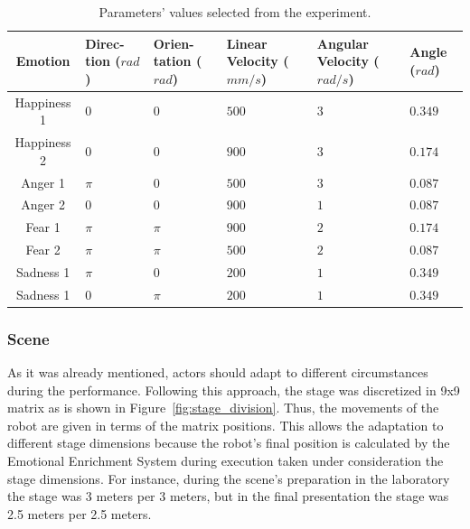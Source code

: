 \begin{table}[h]
\centering
\small
\caption{Parameters' values selected from the experiment.}
		\label{table:selected_fourth}
		\begin{tabular}{|c|p{0.9 cm}|p{0.9 cm}|p{0.9 cm}|p{1.05 cm}|p{0.9 cm}|}
			\hline
\textbf{Emotion}&\textbf{Direc-tion  ($rad$)} & \textbf{Orien-tation ($rad$)} & \textbf{Linear Velocity ($mm/s$) } & \textbf{Angular Velocity ($rad/s$) } & \textbf{Angle ($rad$)} \\
			\hline
			Happiness 1&$0$&$0$&$500$&$3$&$0.349$\\
			\hline
			Happiness 2&$0$&$0$&$900$&$3$&$0.174$\\
			\hline
			Anger 1&$\pi$&$0$&$500$&$3$&$0.087$\\
			\hline
			Anger 2&$0$&$0$&$900$&$1$&$0.087$\\
			\hline
			Fear 1&$\pi$&$\pi$&$900$&$2$&$0.174$\\
			\hline
			Fear 2&$\pi$&$\pi$&$500$&$2$&$0.087$\\
			\hline
			Sadness 1&$\pi$&$0$&$200$&$1$&$0.349$\\
			\hline
			Sadness 1&$0$&$\pi$&$200$&$1$&$0.349$\\
			\hline
			\end{tabular}
\end{table}


\subsubsection{Scene}
As it was already mentioned, actors should adapt to different circumstances during the performance. Following this approach, the stage was discretized in 9x9 matrix as is shown in Figure~\ref{fig:stage_division}. Thus, the movements of the robot are given in terms of the matrix positions. This allows the adaptation to different stage dimensions because the robot's final position is calculated by the Emotional Enrichment System during execution taken under consideration the stage dimensions. For instance, during the scene's preparation in the laboratory the stage was 3 meters per 3 meters, but in the final presentation the stage was 2.5 meters per 2.5 meters.

